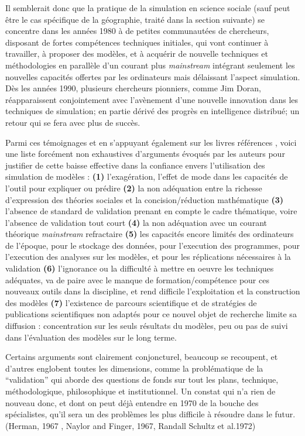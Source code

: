 Il semblerait donc que la pratique de la simulation en science sociale (sauf peut être le cas spécifique de la géographie, traité dans la section suivante) se concentre dans les années 1980 à de petites communautées de chercheurs, disposant de fortes compétences techniques initiales, qui vont continuer à travailler, à proposer des modèles, et à acquérir de nouvelle techniques et méthodologies en parallèle d'un courant plus \textit{mainstream} intégrant seulement les nouvelles capacités offertes par les ordinateurs mais délaissant l'aspect simulation. 
Dès les années 1990, plusieurs chercheurs pionniers, comme Jim Doran, réapparaissent conjointement avec l’avènement d'une nouvelle innovation dans les techniques de simulation; en partie dérivé des progrès en intelligence distribué; un retour qui se fera avec plus de succès.

Parmi ces témoignages et en s'appuyant également sur les livres références \autocite{Naylor1966,Guetzkow1972,Dutton1971}, voici une liste forcément non exhaustives d'arguments évoqués par les auteurs pour justifier de cette baisse effective dans la confiance envers l'utilisation des simulation de modèles : \textbf{(1)} l'exagération, l'effet de mode dans les capacités de l'outil pour expliquer ou prédire \textbf{(2)} la non adéquation entre la richesse d'expression des théories sociales et la concision/réduction mathématique \textbf{(3)} l'absence de standard de validation prenant en compte le cadre thématique, voire l'absence de validation tout court \textbf{(4)} la non adéquation avec un courant théorique \textit{mainstream} refractaire \textbf{(5)} les capacités encore limités des ordinateurs de l'époque, pour le stockage des données, pour l'execution des programmes, pour l'execution des analyses sur les modèles, et pour les réplications nécessaires à la validation \textbf{(6)} l'ignorance ou la difficulté à mettre en oeuvre les techniques adéquates, va de paire avec le manque de formation/compétence pour ces nouveaux outils dans la discipline, et rend difficile l'exploitation et la construction des modèles \textbf{(7)} l'existence de parcours scientifique et de stratégies de publications scientifiques non adaptés pour ce nouvel objet de recherche limite sa diffusion : concentration sur les seuls résultats du modèles, peu ou pas de suivi dans l'évaluation des modèles sur le long terme.

Certains arguments sont clairement conjoncturel, beaucoup se recoupent, et d'autres englobent toutes les dimensions, comme la problématique de la \enquote{validation} qui aborde des questions de fonds sur tout les plans, technique, méthodologique, philosophique et institutionnel. Un constat qui n'a rien de nouveau donc, et dont on peut déjà entendre en 1970 de la bouche des spécialistes, qu'il sera un des problèmes les plus difficile à résoudre dans le futur. (Herman, 1967 , Naylor and Finger, 1967, Randall Schultz et al.1972)  %


